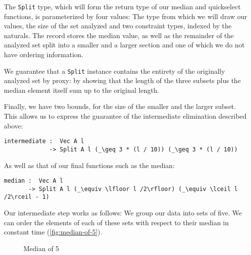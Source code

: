 The \texttt{Split} type, which will form the return type of our median and quickselect functions, is parameterized by four values: The type from which we will draw our values, the size of the set analyzed and two constraint types, indexed by the naturals. The record stores the median value, as well as the remainder of the analyzed set split into a smaller and a larger section and one of which we do not have ordering information.

We guarantee that a \texttt{Split} instance contains the entirety of the originally analyzed set by proxy: by showing that the length of the three subsets plus the median element itself sum up to the original length.

Finally, we have two bounds, for the size of the smaller and the larger subset. This allows us to express the guarantee of the intermediate elimination described above:

\noindent\begin{minipage}{\linewidth}
\begin{lstlisting}[caption={Intermediate function (sketch)}]
intermediate :  Vec A l
             -> Split A l (_\geq 3 * (l / 10)) (_\geq 3 * (l / 10))
\end{lstlisting}
\end{minipage}

As well as that of our final functions such as the median:

\noindent\begin{minipage}{\linewidth}
\begin{lstlisting}[caption={Median function (sketch)}]
median :  Vec A l
       -> Split A l (_\equiv \lfloor l /2\rfloor) (_\equiv \lceil l /2\rceil - 1)
\end{lstlisting}
\end{minipage}


Our intermediate step works as follows: We group our data into sets of five. We can order the elements of each of these sets with respect to their median in constant time (\autoref{fig:median-of-5}).

\begin{figure}[h]
\begin{center}
        
\end{center}
\caption{Median of 5}
\label{fig:median-of-5}
\end{figure}

